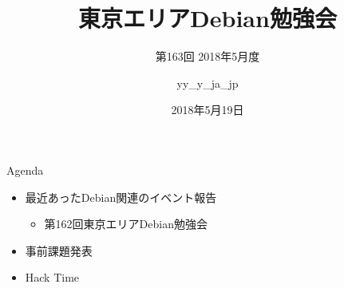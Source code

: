 \title{東京エリアDebian勉強会}
\subtitle{第163回 2018年5月度}
\author{yy\_y\_ja\_jp}
\date{2018年5月19日}



\begin{frame}
\titlepage{}
\end{frame}

\begin{frame}{Agenda}
 \begin{minipage}[t]{0.45\hsize}
  \begin{itemize}
  \item 最近あったDebian関連のイベント報告
    \begin{itemize}
    \item 第162回東京エリアDebian勉強会
    \end{itemize}
  \item 事前課題発表
  \end{itemize}
 \end{minipage}
 \begin{minipage}[t]{0.45\hsize}
  \begin{itemize}
  \item Hack Time
  \end{itemize}
 \end{minipage}
\end{frame}

